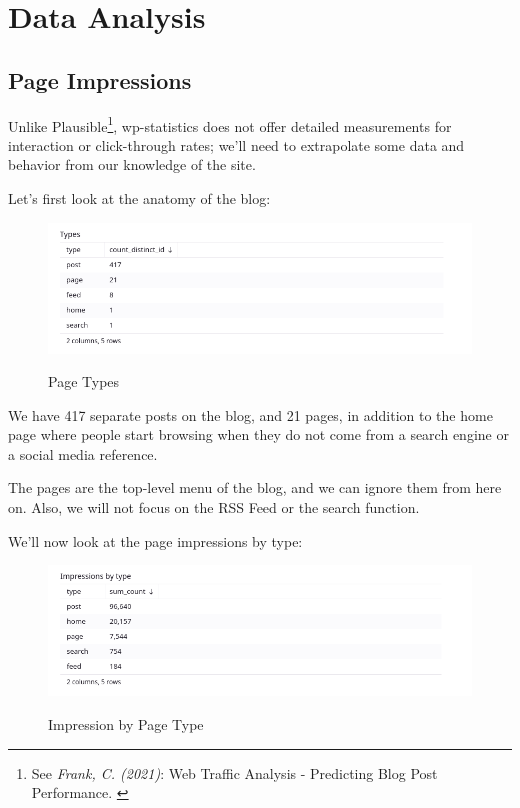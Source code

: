 %
%

\pagebreak
\section{Data Analysis}

\onehalfspacing

\subsection{Page Impressions}

Unlike Plausible\footnote{See \textit{Frank, C. (2021)}: Web Traffic Analysis - Predicting Blog Post Performance. \cite{previousBigData}}, wp-statistics does not offer detailed measurements for interaction or click-through rates; we'll need to extrapolate some data and behavior from our knowledge of the site.

Let's first look at the anatomy of the blog:

\begin{figure}[H]
\centering
\caption {Page Types}
\includegraphics[width=\linewidth]{images/figure10.png}
\label{fig:pageTypes}
\end{figure}

We have 417 separate posts on the blog, and 21 pages, in addition to the home page where people start browsing when they do not come from a search engine or a social media reference. 

The pages are the top-level menu of the blog, and we can ignore them from here on. Also, we will not focus on the RSS Feed or the search function.

We'll now look at the page impressions by type:

\begin{figure}[H]
\centering
\caption {Impression by Page Type}
\includegraphics[width=\linewidth]{images/figure11.png}
\label{fig:impressionType}
\end{figure}

